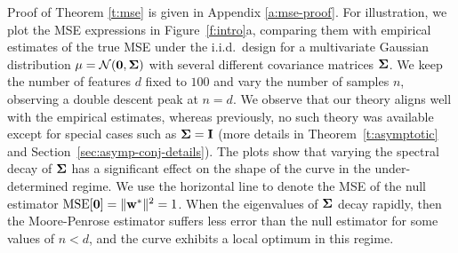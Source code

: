 \documentclass[thesis.tex]{subfiles}
\begin{document}
\noindent
Proof of Theorem \ref{t:mse} is given in Appendix \ref{a:mse-proof}.
For illustration, we plot the MSE expressions in Figure~\ref{f:intro}a,
comparing them with empirical estimates of the true MSE under the
i.i.d.~design for a multivariate Gaussian distribution
$\mu=\mathcal{N}(\mathbf 0,\mathbf{\Sigma})$ with several different covariance matrices $\mathbf{\Sigma}$. We keep the number of features $d$ fixed to
$100$ and vary the number of samples $n$, observing a double descent
peak at $n=d$. We observe that our theory aligns well with
the empirical estimates, whereas
previously, no such theory was available except for special
cases such as $\mathbf{\Sigma}=\mathbf I$ (more details in Theorem~\ref{t:asymptotic}
and Section~\ref{sec:asymp-conj-details}). The plots
show that varying the spectral decay of $\mathbf{\Sigma}$ has a significant effect on the
shape of the curve in the under-determined regime. We use the
horizontal line to denote the MSE of the null estimator
$\mathrm{MSE}[\mathbf 0]=\|\mathbf w^*\|^2=1$. When the eigenvalues of $\mathbf{\Sigma}$
decay rapidly, then the Moore-Penrose estimator suffers less error
than the null estimator for some values of $n<d$, and the curve
exhibits a local optimum in this regime.
\end{document}
